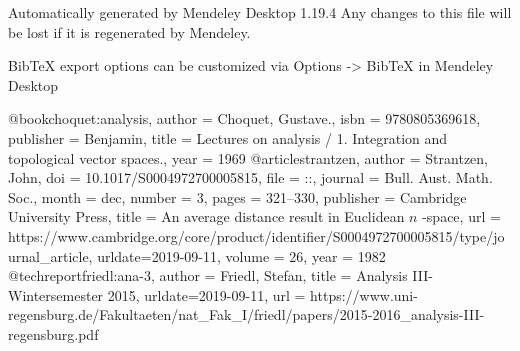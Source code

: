 Automatically generated by Mendeley Desktop 1.19.4
Any changes to this file will be lost if it is regenerated by Mendeley.

BibTeX export options can be customized via Options -> BibTeX in Mendeley Desktop

@book{choquet:analysis,
author = {Choquet, Gustave.},
isbn = {9780805369618},
publisher = {Benjamin},
title = {{Lectures on analysis / 1. Integration and topological vector spaces.}},
year = {1969}
}
@article{strantzen,
author = {Strantzen, John},
doi = {10.1017/S0004972700005815},
file = {::},
journal = {Bull. Aust. Math. Soc.},
month = {dec},
number = {3},
pages = {321--330},
publisher = {Cambridge University Press},
title = {{An average distance result in Euclidean $n$ -space}},
url = {https://www.cambridge.org/core/product/identifier/S0004972700005815/type/journal_article},
urldate={2019-09-11},
volume = {26},
year = {1982}
}
@techreport{friedl:ana-3,
author = {Friedl, Stefan},
title = {{Analysis III-Wintersemester 2015}},
urldate={2019-09-11},
url = {https://www.uni-regensburg.de/Fakultaeten/nat_Fak_I/friedl/papers/2015-2016_analysis-III-regensburg.pdf}
}


